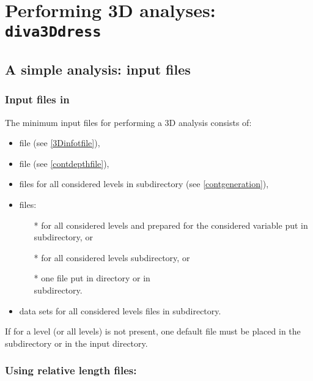 \section{Performing 3D analyses: \texttt{diva3Ddress}}

\subsection{A simple analysis: input files}

\subsubsection{Input files in }

The minimum input files for performing a \diva 3D analysis consists of:

\begin{itemize}
\item {} file (see \ref{3Dinfotfile}),
\item {} file (see \ref{contdepthfile}),
\item {} files for all considered levels in  subdirectory (see \ref{contgeneration}),
\item {} files:
\begin{itemize}
\item[*]  for all considered levels and prepared for the considered variable put in  subdirectory, or
\item[*]  for all considered levels  subdirectory, or
\item[*] one  file put in   directory or in\\ 
 subdirectory.
\end{itemize}
\item data sets for all considered levels  files in  subdirectory.
\end{itemize}


\btips
If for a level (or all levels)  is not present, one default  file must be placed in the  subdirectory or in the input directory.
\etips

\subsubsection{ Using relative length files:}

